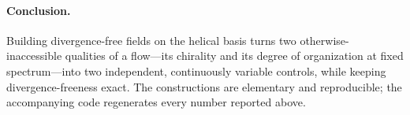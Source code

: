 \documentclass[11pt]{article}
\theoremstyle{remark}
\begin{document}
\paragraph{Conclusion.} Building divergence-free fields on the helical basis turns two
otherwise-inaccessible qualities of a flow---its chirality and its degree of organization at
fixed spectrum---into two independent, continuously variable controls, while keeping
divergence-freeness exact. The constructions are elementary and reproducible; the accompanying
code regenerates every number reported above.



\end{document}

